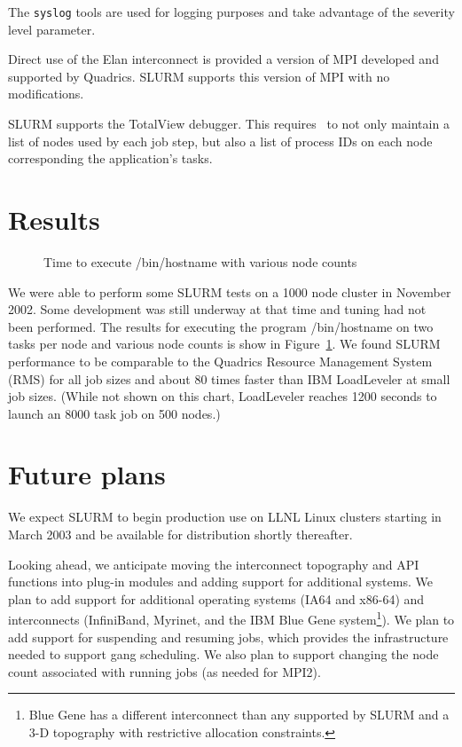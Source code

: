 The {\tt syslog} tools are used for logging purposes and take advantage of the 
severity level parameter.

Direct use of the Elan interconnect is provided a version of MPI developed 
and supported by Quadrics. SLURM supports this version of MPI with no modifications. 

SLURM supports the TotalView debugger\cite{Etnus2002}. 
This requires \srun\ to not only maintain a list of nodes used by each 
job step, but also a list of process IDs on each node corresponding 
the application's tasks.

\section{Results}

\begin{figure}[htb]
\centerline{}
\caption{Time to execute /bin/hostname with various node counts}
\label{timing}
\end{figure}

We were able to perform some SLURM tests on a 1000 node cluster in 
November 2002. Some development was still underway at that time and 
tuning had not been performed. The results for executing the program 
/bin/hostname on two tasks per node and various node counts is show 
in Figure~\ref{timing}. We found SLURM performance to be comparable 
to the Quadrics Resource Management System (RMS)\cite{Quadrics2002} 
for all job sizes and about 80 times faster than IBM 
LoadLeveler\cite{LL2002} at small job sizes.
(While not shown on this chart, LoadLeveler reaches 1200 seconds to 
launch an 8000 task job on 500 nodes.)

\section{Future plans}

We expect SLURM to begin production use on LLNL Linux clusters 
starting in March 2003 and be available for distribution shortly 
thereafter. 

Looking ahead, we anticipate moving the interconnect topography 
and API functions into plug-in modules and adding support for 
additional systems. 
We plan to add support for additional operating systems 
(IA64 and x86-64) and interconnects (InfiniBand, Myrinet, and 
the IBM Blue Gene\cite{BlueGene2002} system\footnote{Blue Gene 
has a different interconnect than any supported by SLURM and 
a 3-D topography with restrictive allocation constraints.}). 
We plan to add support for suspending and resuming jobs, which 
provides the infrastructure needed to support gang scheduling. 
We also plan to support changing the node count associated 
with running jobs (as needed for MPI2).

